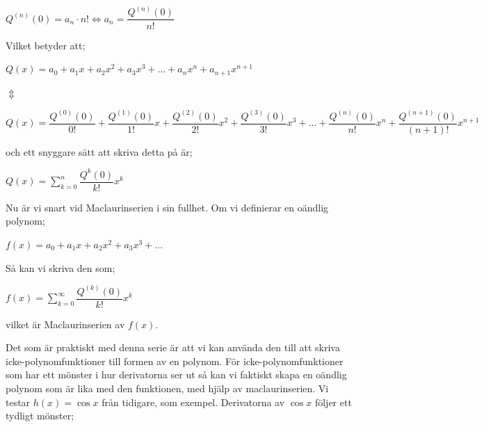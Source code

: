 \documentclass[10pt, a4paper]{amsart}
\begin{document}
\hspace{5ex}
$ Q^{(n)}(0) = a_n \cdot n! \iff a_n = \dfrac{Q^{(n)}(0)}{n!} $ 
\vspace{24pt plus 4pt minus 4pt}

Vilket betyder att;
\vspace{24pt plus 4pt minus 4pt}

\hspace{5ex}
$ Q(x) = a_0 + a_1x + a_2x^2 + a_3x^3 + \dotso + a_nx^n + a_{n+1}x^{n+1} $
\bigskip

\hspace{10ex}
$ \Updownarrow $
\bigskip

\hspace{5ex}
$ Q(x) = \dfrac{Q^{(0)}(0)}{0!} + \dfrac{Q^{(1)}(0)}{1!}x + \dfrac{Q^{(2)}(0)}{2!}x^2 + \dfrac{Q^{(3)}(0)}{3!}x^3 + \dotso + \dfrac{Q^{(n)}(0)}{n!}x^n + \dfrac{Q^{(n+1)}(0)}{(n+1)!}x^{n+1} $ 
\vspace{24pt plus 4pt minus 4pt}

och ett snyggare sätt att skriva detta på är;
\vspace{24pt plus 4pt minus 4pt}

\hspace{5ex}
$ Q(x) = \sum\limits_{k=0}^{n} \dfrac{Q^{k}(0)}{k!}x^k $ 
\vspace{24pt plus 4pt minus 4pt}

Nu är vi snart vid Maclaurinserien i sin fullhet. 
Om vi definierar en oändlig polynom;
\vspace{24pt plus 4pt minus 4pt}

\hspace{5ex}
$ f(x) = a_0 + a_1x + a_2x^2 + a_3x^3 + \dotso $
\vspace{24pt plus 4pt minus 4pt}

Så kan vi skriva den som;
\vspace{24pt plus 4pt minus 4pt}

\hspace{5ex}
$ f(x) = \sum\limits_{k=0}^{\infty} \dfrac{Q^{(k)}(0)}{k!}x^k $ 
\vspace{24pt plus 4pt minus 4pt}

vilket är Maclaurinserien av $ f(x) $.
\bigskip

Det som är praktiskt med denna serie är att vi kan använda den till att skriva icke-polynomfunktioner till formen av en polynom.
För icke-polynomfunktioner som har ett mönster i hur derivatorna ser ut så kan vi faktiskt skapa en oändlig polynom som är lika med den funktionen,
med hjälp av maclaurinserien. Vi testar $ h(x) = \cos x $ från tidigare, som exempel. Derivatorna av $ \cos x $ följer ett tydligt mönster;
\vspace{24pt plus 4pt minus 4pt}
\end{document}
